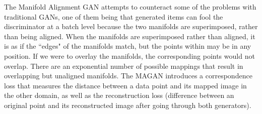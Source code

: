 The Manifold Alignment GAN \cite{magan} attempts to counteract some of the problems with traditional GANs, one of them being that generated items can fool the discriminator at a batch level because the two manifolds are superimposed, rather than being aligned. When the manifolds are superimposed rather than aligned, it is as if the ``edges" of the manifolds match, but the points within may be in any position. If we were to overlay the manifolds, the corresponding points would not overlap. There are an exponential number of possible mappings that result in overlapping but unaligned manifolds. The MAGAN introduces a correspondence loss that measures the distance between a data point and its mapped image in the other domain, as well as the reconstruction loss (difference between an original point and its reconstructed image after going through both generators). %



